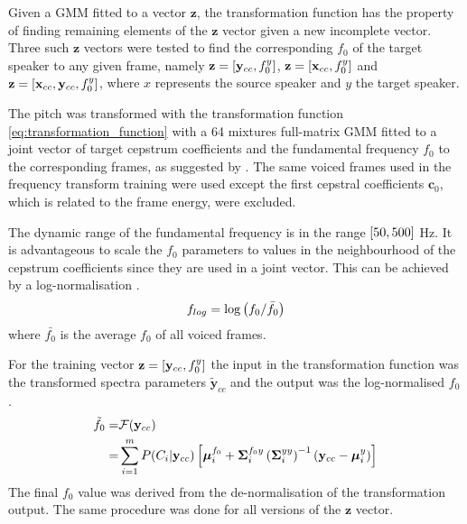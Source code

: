Given a GMM fitted to a vector $\mathbf{z}$, the transformation function has the property of finding remaining elements of the $\mathbf{z}$ vector given a new incomplete vector. Three such $\mathbf{z}$ vectors were tested to find the corresponding $f_0$ of the target speaker to any given frame, namely $\mathbf{z} = \left[\mathbf{y}_{cc},f_0^y\right]$, $\mathbf{z} = \left[\mathbf{x}_{cc},f_0^y\right]$ and $\mathbf{z} = \left[\mathbf{x}_{cc},\mathbf{y}_{cc},f_0^y\right]$, where $x$ represents the source speaker and $y$ the target speaker.

The pitch was transformed with the transformation function \eqref{eq:transformation_function} with a 64 mixtures full-matrix GMM fitted to a joint vector of target cepstrum coefficients and the fundamental frequency $f_0$ to the corresponding frames, as suggested by \cite{najjary03new}. The same voiced frames used in the frequency transform training were used except the first cepstral coefficients $\mathbf{c}_0$, which is related to the frame energy, were excluded. 

The dynamic range of the fundamental frequency is in the range $\left[50,500\right]$ Hz. It is advantageous to scale the $f_0$ parameters to values in the neighbourhood of the cepstrum coefficients since they are used in a joint vector. This can be achieved by a log-normalisation \cite{najjary03new}.
\begin{equation}
	f_{log} = \log \left(f_0/\bar{f_0}\right)
\end{equation}
where $\bar{f_0}$ is the average $f_0$ of all voiced frames.

For the training vector $\mathbf{z} = \left[\mathbf{y}_{cc},f_0^y\right]$ the input in the transformation function was the transformed spectra parameters $\tilde{\mathbf{y}}_{cc}$ and the output was the log-normalised $f_0$.
\begin{equation}
	\label{eq:pitch_transformation}
	\begin{split}
		\tilde{f}_0 =& \mathcal F(\mathbf{y}_{cc})\\
		=& \sum_{i=1}^{m}P(C_i \vert \mathbf{y}_{cc}) \left[\boldsymbol{\mu}_i^{f_0} + \mathbf{\Sigma}_i^{f_0y} \left(\mathbf{\Sigma}_i^{yy}\right)^{-1} (\mathbf{y}_{cc}-\boldsymbol{\mu}_i^y)\right]
	\end{split}
\end{equation}
The final $f_0$ value was derived from the de-normalisation of the transformation output. The same procedure was done for all versions of the $\mathbf{z}$ vector.

